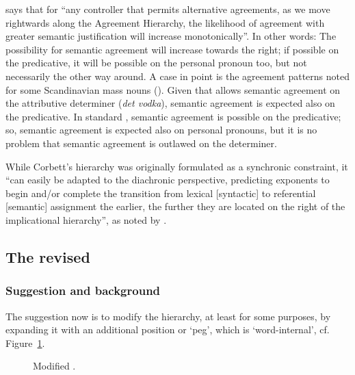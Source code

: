 \documentclass[output=paper]{langsci/langscibook}
\begin{document}
\begin{exe}
\begin{xlist}
\begin{xlist}
%
\citet[207]{Corbett2006} %
%
says that for ``any controller that permits
alternative agreements, as we move rightwards along the Agreement
Hierarchy, the likelihood of agreement with greater semantic
justification will increase monotonically''. In other words: The
possibility for semantic agreement will increase towards the right; if
possible on the predicative, it will be possible on the personal pronoun
too, but not necessarily the other way around. A case in point is the
agreement patterns noted for some Scandinavian mass nouns (). Given
that  allows semantic agreement on the attributive determiner
(\emph{det vodka}), semantic agreement is expected also on the
predicative. In standard , semantic agreement is possible on the
predicative; so, semantic agreement is expected also on personal
pronouns, but it is no problem that semantic agreement is outlawed on
the determiner.

While Corbett's hierarchy was originally  formulated as a synchronic
constraint, it ``can easily be adapted to the diachronic perspective,
predicting  exponents to begin and/or complete the transition from
lexical {[}syntactic{]} to referential {[}semantic{]} assignment the
earlier, the further they are located on the right of the implicational
hierarchy'', as noted by %
\citet[55]{Dolberg14}%
%
.

\subsection{The revised }

\subsubsection{Suggestion and background}
\label{sec:enger:3.2.1}

The suggestion now is to modify the hierarchy, at least for some
purposes, by expanding it with an additional position or `peg', which is
`word-internal', cf. Figure~\ref{fig:Enger:agree2}.


\begin{figure}
\centering
{}
\caption{Modified .}
\label{fig:Enger:agree2}
\end{figure}


\end{xlist}
\end{xlist}
\end{exe}
\end{document}

